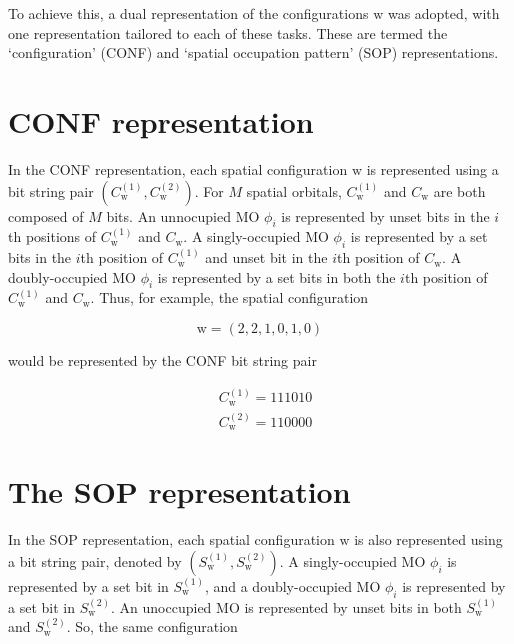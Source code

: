 \documentclass[12pt,a4paper]{report}
\begin{document}
\noindent
To achieve this, a dual representation of the configurations
$\text{w}$ was adopted, with one representation tailored to each of
these tasks. These are termed the `configuration' (CONF) and `spatial
occupation pattern' (SOP) representations.

\section{CONF representation}
In the CONF representation, each spatial configuration $\text{w}$ is
represented using a bit string pair $(C_{\text{w}}^{(1)},
C_{\text{w}}^{(2)})$. For $M$ spatial orbitals, $C_{\text{w}}^{(1)}$
and $C_{\text{w}}$ are both composed of $M$ bits. An unnocupied MO
$\phi_{i}$ is represented by unset bits in the $i$th positions of
$C_{\text{w}}^{(1)}$ and $C_{\text{w}}$. A singly-occupied MO
$\phi_{i}$ is represented by a set bits in the $i$th position of
$C_{\text{w}}^{(1)}$ and unset bit in the $i$th position of
$C_{\text{w}}$. A doubly-occupied MO $\phi_{i}$ is represented by a
set bits in both the $i$th position of $C_{\text{w}}^{(1)}$ and
$C_{\text{w}}$. Thus, for example, the spatial configuration

\begin{equation*}
  \text{w} = (2,2,1,0,1,0)
\end{equation*}

\noindent
would be represented by the CONF bit string pair

\begin{equation*}
  \begin{aligned}
    &C_{\text{w}}^{(1)} = 1 1 1 0 1 0 \\
    &C_{\text{w}}^{(2)} = 1 1 0 0 0 0
  \end{aligned}
\end{equation*}

\section{The SOP representation}
In the SOP representation, each spatial configuration $\text{w}$ is
also represented using a bit string pair, denoted by
$(S_{\text{w}}^{(1)}, S_{\text{w}}^{(2)})$. A singly-occupied MO
$\phi_{i}$ is represented by a set bit in $S_{\text{w}}^{(1)}$, and a
doubly-occupied MO $\phi_{i}$ is represented by a set bit in
$S_{\text{w}}^{(2)}$. An unoccupied MO is represented by unset bits in
both $S_{\text{w}}^{(1)}$ and $S_{\text{w}}^{(2)}$. So, the same
configuration
\end{document}

